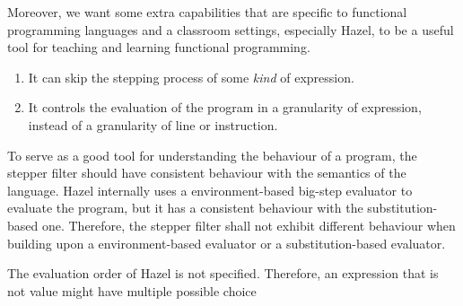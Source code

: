 Moreover, we want some extra capabilities that are specific to functional
programming languages and a classroom settings, especially Hazel, to be a
useful tool for teaching and learning functional programming.
\begin{enumerate}
  \item It can skip the stepping process of some \emph{kind} of expression.
  \item It controls the evaluation of the program in a granularity of
  expression, instead of a granularity of line or instruction.
\end{enumerate}

To serve as a good tool for understanding the behaviour of a program, the stepper
filter should have consistent behaviour with the semantics of the language. Hazel
internally uses a environment-based big-step evaluator to evaluate the program,
but it has a consistent behaviour with the substitution-based one. Therefore,
the stepper filter shall not exhibit different behaviour when building upon a
environment-based evaluator or a substitution-based evaluator.

The evaluation order of Hazel is not specified. Therefore, an expression that is
not value might have multiple possible choice

